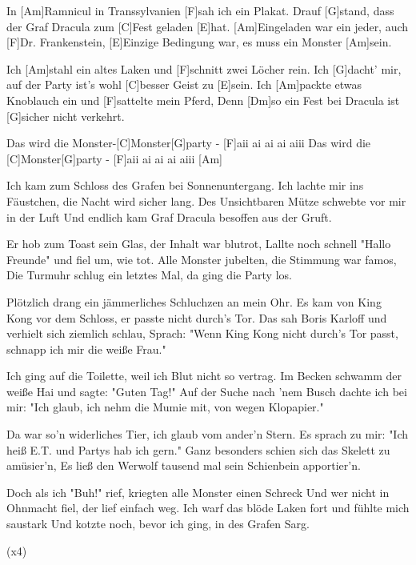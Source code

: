

\begin{guitar}
	In [Am]Ramnicul in Transsylvanien [F]sah ich ein Plakat.
	Drauf [G]stand, dass der Graf Dracula zum [C]Fest geladen [E]hat.
	[Am]Eingeladen war ein jeder, auch [F]Dr. Frankenstein,
	[E]Einzige Bedingung war, es muss ein Monster [Am]sein.
	
	Ich [Am]stahl ein altes Laken und [F]schnitt zwei Löcher rein.
	Ich [G]dacht' mir, auf der Party ist's wohl [C]besser Geist zu [E]sein.
	Ich [Am]packte etwas Knoblauch ein und [F]sattelte mein Pferd,
	Denn [Dm]so ein Fest bei Dracula ist [G]sicher nicht verkehrt.
	
	Das wird die Monster-[C]Monster[G]party - [F]aii ai ai ai aiii
	Das wird die [C]Monster[G]party - [F]aii ai ai ai aiii [Am]{}
	
	Ich kam zum Schloss des Grafen bei Sonnenuntergang.
	Ich lachte mir ins Fäustchen, die Nacht wird sicher lang.
	Des Unsichtbaren Mütze schwebte vor mir in der Luft
	Und endlich kam Graf Dracula besoffen aus der Gruft.
	
	Er hob zum Toast sein Glas, der Inhalt war blutrot,
	Lallte noch schnell "Hallo Freunde" und fiel um, wie tot.
	Alle Monster jubelten, die Stimmung war famos,
	Die Turmuhr schlug ein letztes Mal, da ging die Party los.
	
	 
	
	Plötzlich drang ein jämmerliches Schluchzen an mein Ohr.
	Es kam von King Kong vor dem Schloss, er passte nicht durch's Tor.
	Das sah Boris Karloff und verhielt sich ziemlich schlau,
	Sprach: "Wenn King Kong nicht durch's Tor passt, schnapp ich mir die weiße Frau."
	
	\pagebreak
	
	Ich ging auf die Toilette, weil ich Blut nicht so vertrag.
	Im Becken schwamm der weiße Hai und sagte: "Guten Tag!"
	Auf der Suche nach 'nem Busch dachte ich bei mir:
	"Ich glaub, ich nehm die Mumie mit, von wegen Klopapier."
	
	 
	
	Da war so'n widerliches Tier, ich glaub vom ander'n Stern.
	Es sprach zu mir: "Ich heiß E.T. und Partys hab ich gern."
	Ganz besonders schien sich das Skelett zu amüsier'n,
	Es ließ den Werwolf tausend mal sein Schienbein apportier'n.
	
	Doch als ich "Buh!" rief, kriegten alle Monster einen Schreck
	Und wer nicht in Ohnmacht fiel, der lief einfach weg.
	Ich warf das blöde Laken fort und fühlte mich saustark
	Und kotzte noch, bevor ich ging, in des Grafen Sarg.
	
	  (x4)
\end{guitar}
